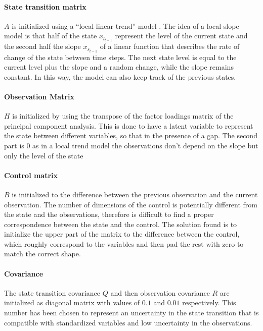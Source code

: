 \documentclass{article}
\begin{document}
\paragraph{State transition matrix} $A$ is initialized using a ``local linear trend'' model \cite{durbin_time_2012}. The idea of a local slope model is that half of the state $x_{l_{t-1}}$ represent the level of the current state and the second half the slope $x_{s_{t-1}}$ of a linear function that describes the rate of change of the state between time steps. The next state level is equal to the current level plus the slope and a random change, while the slope remains constant. In this way, the model can also keep track of the previous states.

\paragraph{Observation Matrix} $H$ is initialized by using the transpose of the factor loadings matrix of the principal component analysis. This is done to have a latent variable to represent the state between different variables, so that in the presence of a gap. The second part is 0 as in a local trend model the observations don't depend on the slope but only the level of the state

\paragraph{Control matrix} $B$ is initialized to the difference between the previous observation and the current observation. The number of dimensions of the control is potentially different from the state and the observations, therefore is difficult to find a proper correspondence between the state and the control. The solution found is to initialize the upper part of the matrix to the difference between the control, which roughly correspond to the variables and then pad the rest with zero to match the correct shape.

\paragraph{Covariance} The state transition covariance $Q$ and then observation covariance $R$ are initialized as diagonal matrix with values of $0.1$ and $0.01$ respectively. This number has been chosen to represent an uncertainty in the state transition that is compatible with standardized variables  and low uncertainty in the observations. 
\end{document}
